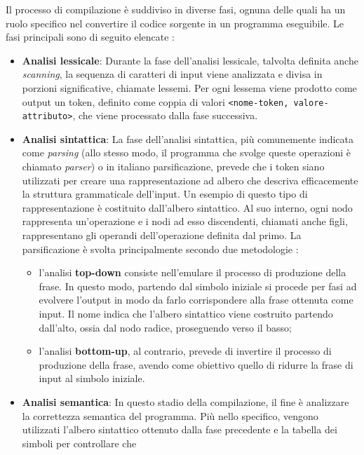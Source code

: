 \documentclass[12pt,a4paper,openright,twoside]{book}
\begin{document}
Il processo di compilazione è suddiviso in diverse fasi, ognuna delle quali ha un ruolo specifico nel convertire il codice sorgente in un 
programma eseguibile. Le fasi principali sono di seguito elencate \cite{Aho2006}:
\begin{itemize}
    \item \textbf{Analisi lessicale}: Durante la fase dell'analisi lessicale, talvolta definita anche \textit{scanning}, la sequenza di 
    caratteri di input viene analizzata e divisa in porzioni significative, chiamate lessemi. Per ogni lessema viene prodotto come output un 
    token, definito come coppia di valori \texttt{<nome-token, valore-attributo>}, che viene processato dalla fase successiva.
    \item \textbf{Analisi sintattica}: La fase dell'analisi sintattica, più comunemente indicata come \textit{parsing} (allo stesso modo, 
    il programma che svolge queste operazioni è chiamato \textit{parser}) o in italiano parsificazione, prevede che i token siano 
    utilizzati per creare una rappresentazione ad albero che descriva efficacemente la struttura grammaticale dell'input. Un esempio di 
    questo tipo di rappresentazione è costituito dall'albero sintattico. Al suo interno, ogni nodo rappresenta un'operazione e i nodi ad 
    esso discendenti, chiamati anche figli, rappresentano gli operandi dell'operazione definita dal primo. La parsificazione è svolta 
    principalmente secondo due metodologie \cite{Grune2006}:
    \begin{itemize}
        \item l’analisi \textbf{top-down} consiste nell'emulare il processo di produzione della frase. In questo modo, partendo dal simbolo 
        iniziale si procede per fasi ad evolvere l'output in modo da farlo corrispondere alla frase ottenuta come input. Il nome indica che 
        l'albero sintattico viene costruito partendo dall'alto, ossia dal nodo radice, proseguendo verso il basso;
        \item l’analisi \textbf{bottom-up}, al contrario, prevede di invertire il processo di produzione della frase, avendo come obiettivo 
        quello di ridurre la frase di input al simbolo iniziale.
    \end{itemize}
    \item \textbf{Analisi semantica}: In questo stadio della compilazione, il fine è analizzare la correttezza semantica del programma. Più 
    nello specifico, vengono utilizzati l'albero sintattico ottenuto dalla fase precedente e la tabella dei simboli per controllare che 

\end{itemize}
\end{document}

